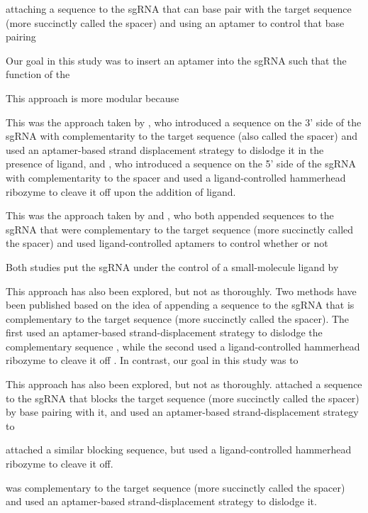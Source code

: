 \documentclass[10pt,oneside]{article}
\begin{document}
attaching a sequence to the sgRNA that can base pair with the  target sequence (more succinctly called the spacer) and using an aptamer to control that base pairing 

Our goal in this study was to insert an aptamer into the sgRNA such that the function of the 

This approach is more modular because 

This was the approach taken by , who introduced a sequence on the 3' side of the sgRNA with complementarity to the  target sequence (also called the spacer) and used an aptamer-based strand displacement strategy to dislodge it in the presence of ligand, and , who introduced a sequence on the 5' side of the sgRNA with complementarity to the spacer and used a ligand-controlled hammerhead ribozyme to cleave it off upon the addition of ligand.

This was the approach taken by  and , who both appended sequences to the sgRNA that were complementary to the  target sequence (more succinctly called the spacer) and used ligand-controlled aptamers to control whether or not 

Both studies put the sgRNA under the control of a small-molecule ligand by 

This approach has also been explored, but not as thoroughly.  Two methods have been published based on the idea of appending a sequence to the sgRNA that is complementary to the  target sequence (more succinctly called the spacer).  The first used an aptamer-based strand-displacement strategy to dislodge the complementary sequence \autocite{liu2016}, while the second used a ligand-controlled hammerhead ribozyme to cleave it off \autocite{tang2017}.  In contrast, our goal in this study was to 

This approach has also been explored, but not as thoroughly.   attached a sequence to the sgRNA that blocks the  target sequence (more succinctly called the spacer) by base pairing with it, and used an aptamer-based strand-displacement strategy to 

 attached a similar blocking sequence, but used a ligand-controlled hammerhead ribozyme to cleave it off.

was complementary to the  target sequence (more succinctly called the spacer) and used an aptamer-based strand-displacement strategy to dislodge it. 
\end{document}
